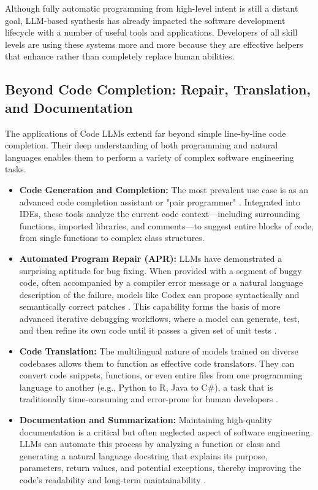 \documentclass[12pt, a4paper]{report}
\begin{document}
Although fully automatic programming from high-level intent is still a distant goal, LLM-based synthesis has already impacted the software development lifecycle with a number of useful tools and applications. Developers of all skill levels are using these systems more and more because they are effective helpers that enhance rather than completely replace human abilities.

\subsection{Beyond Code Completion: Repair, Translation, and Documentation}

The applications of Code LLMs extend far beyond simple line-by-line code completion. Their deep understanding of both programming and natural languages enables them to perform a variety of complex software engineering tasks.
\begin{itemize}
    \item \textbf{Code Generation and Completion:} The most prevalent use case is as an advanced code completion assistant or "pair programmer" \citep{gulwani2017program}. Integrated into IDEs, these tools analyze the current code context—including surrounding functions, imported libraries, and comments—to suggest entire blocks of code, from single functions to complex class structures.
    \item \textbf{Automated Program Repair (APR):} LLMs have demonstrated a surprising aptitude for bug fixing. When provided with a segment of buggy code, often accompanied by a compiler error message or a natural language description of the failure, models like Codex can propose syntactically and semantically correct patches \citep{chen2021evaluating}. This capability forms the basis of more advanced iterative debugging workflows, where a model can generate, test, and then refine its own code until it passes a given set of unit tests \citep{huang2023jensen}.
    \item \textbf{Code Translation:} The multilingual nature of models trained on diverse codebases allows them to function as effective code translators. They can convert code snippets, functions, or even entire files from one programming language to another (e.g., Python to R, Java to C\#), a task that is traditionally time-consuming and error-prone for human developers \citep{chen2021evaluating}.
    \item \textbf{Documentation and Summarization:} Maintaining high-quality documentation is a critical but often neglected aspect of software engineering. LLMs can automate this process by analyzing a function or class and generating a natural language docstring that explains its purpose, parameters, return values, and potential exceptions, thereby improving the code's readability and long-term maintainability \citep{ma2023doc}.
\end{itemize}
\end{document}
